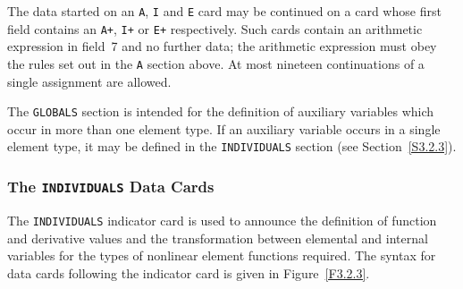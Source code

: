 \documentclass[a4paper]{article}
\begin{document}
The  data started on  an  {\tt  A}, {\tt  I}  and {\tt  E}  card
may be
continued on a card whose first field contains an {\tt A+}, {\tt I+} or
{\tt E+} respectively.
Such cards contain an arithmetic expression in
field~7 and no further data;  the  arithmetic expression must obey the
rules   set  out in   the {\tt A}  section   above.  At  most nineteen
continuations of a single assignment are allowed.

The {\tt GLOBALS}
section is intended for the definition  of auxiliary
variables which occur in more than one element  type.
If an auxiliary
variable occurs  in a single element  type, it  may  be defined in the
{\tt INDIVIDUALS}
section (see Section~\ref{S3.2.3}).

\subsubsection{\label{S3.2.3}The {\tt INDIVIDUALS} Data Cards}

The  {\tt  INDIVIDUALS}
indicator   card   is   used  to  announce the
definition  of function  and derivative
values  and the transformation
between elemental
and internal variables  for the  types of nonlinear
element functions required.
The syntax for data  cards following the
indicator card is given in Figure~\ref{F3.2.3}.
\end{document}
